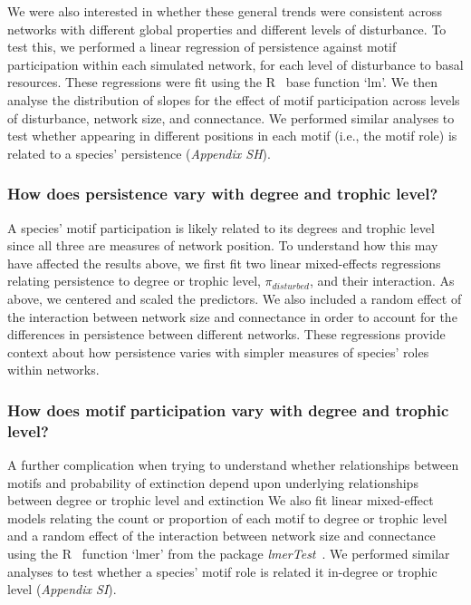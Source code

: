\documentclass[12pt]{article}
\begin{document}
\begin{spacing}{2.0}
            We were also interested in whether these general trends were consistent across networks with different global properties and different levels of disturbance. 
            To test this, we performed a linear regression of persistence against motif participation within each simulated network, for each level of disturbance to basal resources.
            These regressions were fit using the R~\citep{R} base function `lm'.
            We then analyse the distribution of slopes for the effect of motif participation across levels of disturbance, network size, and connectance. 
            We performed similar analyses to test whether appearing in different positions in each motif (i.e., the motif role) is related to a species' persistence (\emph{Appendix SH}).

        \subsubsection*{How does persistence vary with degree and trophic level?}
        
            A species' motif participation is likely related to its degrees and trophic level since all three are measures of network position.
            To understand how this may have affected the results above, we first fit two linear mixed-effects regressions relating persistence to degree or trophic level, $\pi_{disturbed}$, and their interaction.
            As above, we centered and scaled the predictors.
            We also included a random effect of the interaction between network size and connectance in order to account for the differences in persistence between different networks. 
            These regressions provide context about how persistence varies with simpler measures of species' roles within networks.
                    
        
        \subsubsection*{How does motif participation vary with degree and trophic level?}

            A further complication when trying to understand whether relationships between motifs and probability of extinction depend upon underlying relationships between degree or trophic level and extinction 
            We also fit linear mixed-effect models relating the count or proportion of each motif to degree or trophic level and a random effect of the interaction between network size and connectance using the R~\citep{R} function `lmer' from the package \emph{lmerTest}~\citep{lmerTest}.
            We performed similar analyses to test whether a species' motif role is related it in-degree or trophic level (\emph{Appendix SI}).
        

\end{spacing}
\end{document}
